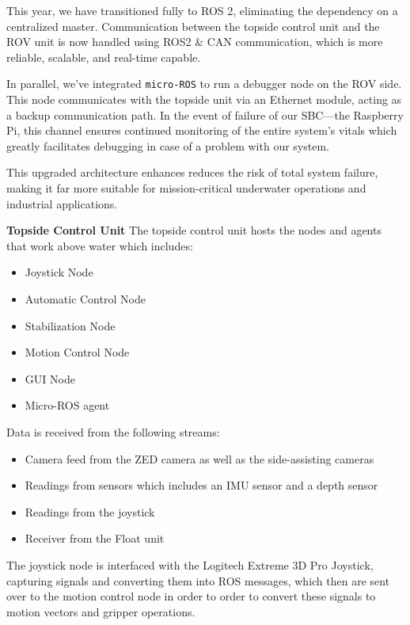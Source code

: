 \vspace{0.5em}
This year, we have transitioned fully to ROS 2, eliminating the dependency on a centralized master. Communication between the topside control unit and the ROV unit is now handled using ROS2 \& CAN communication, which is more reliable, scalable, and real-time capable.
\vspace{0.5em}


In parallel, we’ve integrated \texttt{micro-ROS} to run a debugger node on the ROV side. This node communicates with the topside unit via an Ethernet module, acting as a backup communication path. In the event of failure of our SBC—the Raspberry Pi, this channel ensures continued monitoring of the entire system's vitals which greatly facilitates debugging in case of a problem with our system.

\vspace{0.5em}
This upgraded architecture enhances reduces the risk of total system failure, making it far more suitable for mission-critical underwater operations and industrial applications.

\vspace{0.2cm}
\textbf{Topside Control Unit}
The topside control unit hosts the nodes and agents that work above water which includes:
\begin{itemize}
    \item Joystick Node
    \item Automatic Control Node
    \item Stabilization Node
    \item Motion Control Node 
    \item GUI Node
    \item Micro-ROS agent
\end{itemize}
Data is received from the following streams:
\begin{itemize}
    \item Camera feed from the ZED camera as well as the side-assisting cameras
    \item Readings from sensors which includes an IMU sensor and a depth sensor
    \item Readings from the joystick
    \item Receiver from the Float unit
\end{itemize}
The joystick node is interfaced with the Logitech Extreme 3D Pro Joystick, capturing signals and converting them into ROS messages, which then are sent over to the motion control node in order to order to convert these signals to motion vectors and gripper operations. 

